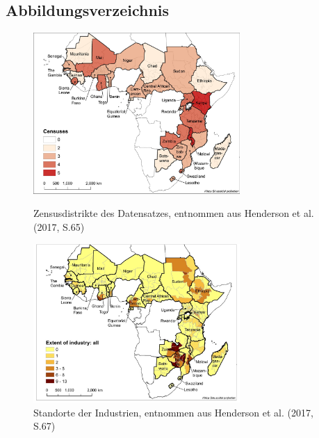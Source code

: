 \hypertarget{lof}{%
\subsection*{Abbildungsverzeichnis}\label{lof}}

\begin{figure}[H]

{\centering \includegraphics[width=0.7\textwidth]{../../images/2022-06-28_10-00-00.jpg}

}

\caption{Zensusdistrikte des Datensatzes, entnommen aus Henderson et al. (2017, S.65)}


{\centering \includegraphics[width=0.7\textwidth]{../../images/2022-06-28_10-00-01.jpg}

}

\caption{Standorte der Industrien, entnommen aus Henderson et al. (2017, S.67)}

\end{figure}

\newpage
{}

